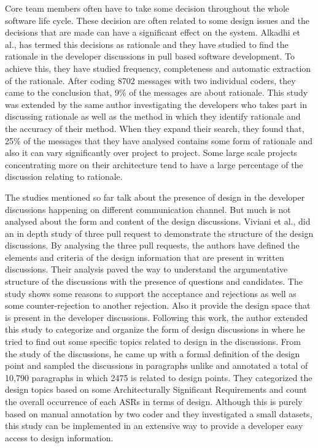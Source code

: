 Core team members often have to take some decision throughout the whole software life cycle. These decision are often related to some design issues and the decisions that are made can have a significant effect on the system. Alkadhi et al.,\cite{Alkadhi2017} has termed this decisions as rationale and they have studied to find the rationale in the developer discussions in pull based software development. To achieve this, they have studied frequency, completeness and automatic extraction of the rationale. After coding 8702 messages with two individual coders, they came to the conclusion that, 9\% of the messages are about rationale. This study was extended by the same author \cite{Alkadhi2018} investigating the developers who takes part in discussing rationale as well as the method in which they identify rationale and the accuracy of their method. When they expand their search, they found that, 25\% of the messages that they have analysed contains some form of rationale and also it can vary significantly over project to project. Some large scale projects concentrating more on their architecture tend to have a large percentage of the discussion relating to rationale.

The studies mentioned so far talk about the presence of design in the developer discussions happening on different communication channel. But much is not analysed about the form and content of the design discussions. Viviani et al.,\cite{Viviani2018a} did an in depth study of three pull request to demonstrate the structure of the design discussions. By analysing the three pull requests, the authors have defined the elements and criteria of the design information that are present in written discussions. Their analysis paved the way to understand the argumentative structure of the discussions with the presence of questions and candidates. The study shows some reasons to support the acceptance and rejections as well as some counter-rejection to another rejection. Also it provide the design space that is present in the developer discussions. Following this work, the author extended this study to categorize and organize the form of design discussions in \cite{Viviani2018} where he tried to find out some specific topics related to design in the discussions. From the study of the discussions, he came up with a formal definition of the design point and sampled the discussions in paragraphs unlike \cite{Brunet2014a} and annotated a total of 10,790 paragraphs in which 2475 is related to design points. They categorized the design topics based on some Architecturally Significant Requirements and count the overall occurrence of each ASRs in terms of design. Although this is purely based on manual annotation by two coder and they investigated a small datasets, this study can be implemented in an extensive way to provide a developer easy access to design information.   

